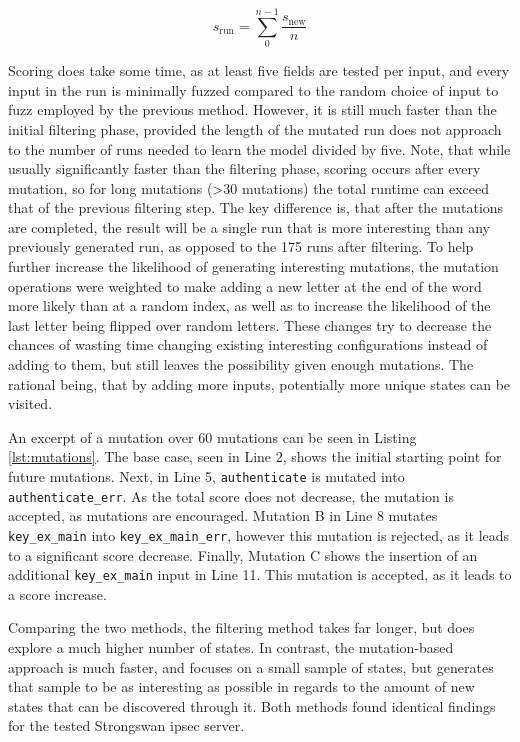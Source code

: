 \begin{equation}s_\mathrm{run} = \sum_{0}^{n-1} \frac{s_\mathrm{new}}{n} \end{equation} \label{eq:scoring}

Scoring does take some time, as at least five fields are tested per input, and every input in the run is minimally fuzzed compared to the random choice of input to fuzz employed by the previous method. However, it is still much faster than the initial filtering phase, provided the length of the mutated run does not approach to the number of runs needed to learn the model divided by five. Note, that while usually significantly faster than the filtering phase, scoring occurs after every mutation, so for long mutations (>30 mutations) the total runtime can exceed that of the previous filtering step. The key difference is, that after the mutations are completed, the result will be a single run that is more interesting than any previously generated run, as opposed to the 175 runs after filtering. To help further increase the likelihood of generating interesting mutations, the mutation operations were weighted to make adding a new letter at the end of the word more likely than at a random index, as well as to increase the likelihood of the last letter being flipped over random letters. These changes try to decrease the chances of wasting time changing existing interesting configurations instead of adding to them, but still leaves the possibility given enough mutations. The rational being, that by adding more inputs, potentially more unique states can be visited. 

An excerpt of a mutation over 60 mutations can be seen in Listing \ref{lst:mutations}. The base case, seen in Line 2, shows the initial starting point for future mutations. Next, in Line 5, \texttt{authenticate} is mutated into \texttt{authenticate\_err}. As the total score does not decrease, the mutation is accepted, as mutations are encouraged. Mutation B in Line 8 mutates \texttt{key\_ex\_main} into \texttt{key\_ex\_main\_err}, however this mutation is rejected, as it leads to a significant score decrease. Finally, Mutation C shows the insertion of an additional \texttt{key\_ex\_main} input in Line 11. This mutation is accepted, as it leads to a score increase.

Comparing the two methods, the filtering method takes far longer, but does explore a much higher number of states. In contrast, the mutation-based approach is much faster, and focuses on a small sample of states, but generates that sample to be as interesting as possible in regards to the amount of new states that can be discovered through it.
Both methods found identical findings for the tested Strongswan \ac{ipsec} server.


